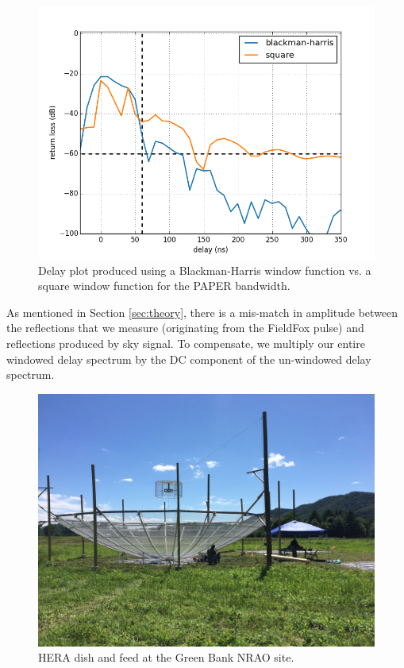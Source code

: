 \documentclass[12pt,preprint]{aastex}
\begin{document}
\begin{figure}
\centering
\includegraphics[totalheight=0.5\textheight]{plots/bh_vs_sq.png}
\caption{Delay plot produced using a Blackman-Harris window function vs. a square window function for the PAPER bandwidth.}
\label{fig:window}
\end{figure}

As mentioned in Section \ref{sec:theory}, there is a mis-match in amplitude between the reflections that we measure (originating from the FieldFox pulse) and reflections produced by sky signal. To compensate, we multiply our entire windowed delay spectrum by the DC component of the un-windowed delay spectrum.

\begin{figure}
\centering
\includegraphics[trim={2cm 20cm 30cm 15cm},clip, totalheight=0.45\textheight]{plots/heradish.jpg}
\caption{HERA dish and feed at the Green Bank NRAO site.}
\label{fig:heradish}
\end{figure}
\end{document}
